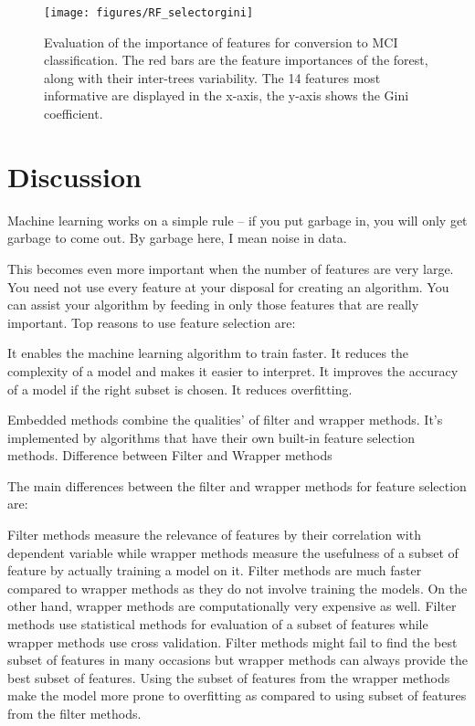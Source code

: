 \documentclass[preprint,12pt]{elsarticle}
\begin{document}
\begin{figure}[!htb]
        \centering
        \texttt{[image: figures/RF\_selectorgini]}
        \caption{Evaluation of the importance of features for conversion to MCI classification. The red bars are the feature importances of the forest, along with their inter-trees variability. The 14 features most informative are displayed in the x-axis, the y-axis shows the Gini coefficient.} 
        \label{fig:RF_selectorgini}
\end{figure}

\section{Discussion}
\label{S:4}
Machine learning works on a simple rule – if you put garbage in, you will only get garbage to come out. By garbage here, I mean noise in data.

This becomes even more important when the number of features are very large. You need not use every feature at your disposal for creating an algorithm. You can assist your algorithm by feeding in only those features that are really important. 
Top reasons to use feature selection are:

    It enables the machine learning algorithm to train faster.
    It reduces the complexity of a model and makes it easier to interpret.
    It improves the accuracy of a model if the right subset is chosen.
    It reduces overfitting.

Embedded methods combine the qualities’ of filter and wrapper methods. It’s implemented by algorithms that have their own built-in feature selection methods.
Difference between Filter and Wrapper methods

The main differences between the filter and wrapper methods for feature selection are:

    Filter methods measure the relevance of features by their correlation with dependent variable while wrapper methods measure the usefulness of a subset of feature by actually training a model on it.
    Filter methods are much faster compared to wrapper methods as they do not involve training the models. On the other hand, wrapper methods are computationally very expensive as well.
    Filter methods use statistical methods for evaluation of a subset of features while wrapper methods use cross validation.
    Filter methods might fail to find the best subset of features in many occasions but wrapper methods can always provide the best subset of features.
    Using the subset of features from the wrapper methods make the model more prone to overfitting as compared to using subset of features from the filter methods.
\end{document}
